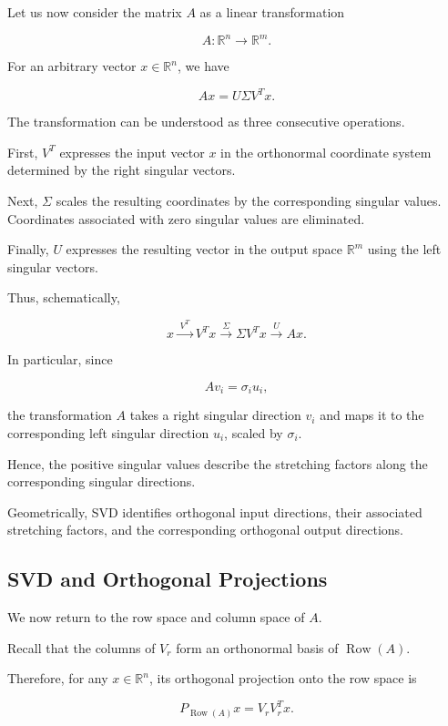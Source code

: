 \documentclass[11pt]{article}
\begin{document}
Let us now consider the matrix $A$
as a linear transformation

\[
A:\mathbb{R}^n\longrightarrow
\mathbb{R}^m.
\]

For an arbitrary vector
$x\in\mathbb{R}^n$, we have

\[
Ax=U\Sigma V^Tx.
\]

The transformation can be understood
as three consecutive operations.

First, $V^T$ expresses the input
vector $x$ in the orthonormal
coordinate system determined by
the right singular vectors.

Next, $\Sigma$ scales the resulting
coordinates by the corresponding
singular values. Coordinates associated
with zero singular values are
eliminated.

Finally, $U$ expresses the resulting
vector in the output space
$\mathbb{R}^m$ using the left
singular vectors.

Thus, schematically,

\[
\boxed{
x
\xrightarrow{\;V^T\;}
V^Tx
\xrightarrow{\;\Sigma\;}
\Sigma V^Tx
\xrightarrow{\;U\;}
Ax.
}
\]

In particular, since

\[
Av_i=\sigma_i u_i,
\]

the transformation $A$ takes a
right singular direction $v_i$
and maps it to the corresponding
left singular direction $u_i$,
scaled by $\sigma_i$.

Hence, the positive singular values
describe the stretching factors
along the corresponding singular
directions.

Geometrically, SVD identifies
orthogonal input directions,
their associated stretching
factors, and the corresponding
orthogonal output directions.

\subsection{SVD and Orthogonal Projections}

We now return to the row space
and column space of $A$.

Recall that the columns of $V_r$
form an orthonormal basis of
$\operatorname{Row}(A)$.

Therefore, for any
$x\in\mathbb{R}^n$, its
orthogonal projection onto the
row space is

\[
\boxed{
P_{\operatorname{Row}(A)}x
=
V_rV_r^Tx.
}
\]
\end{document}
